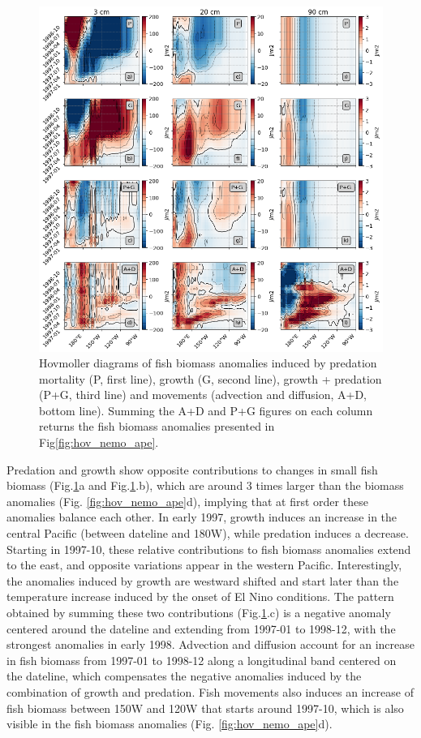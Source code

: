 \begin{figure}
	\centering
	\includegraphics[scale=0.4]{figs/hovmoller_anoms_oope_trends.png}	
	\caption{Hovmoller diagrams of fish biomass anomalies induced by predation mortality (P, first line), growth (G, second line), growth + predation (P+G, third line) and movements (advection and diffusion, A+D, bottom line). Summing the A+D and P+G figures on each column returns the fish biomass anomalies presented in Fig\ref{fig:hov_nemo_ape}.}	
	\label{fig:hov_ape_trends}
\end{figure}

Predation and growth show opposite contributions to changes in small fish biomass (Fig.\ref{fig:hov_ape_trends}a and Fig.\ref{fig:hov_ape_trends}.b), which are around 3 times larger than the biomass anomalies (Fig. \ref{fig:hov_nemo_ape}d), implying that at first order these anomalies balance each other. In early 1997, growth induces an increase in the central Pacific (between dateline and 180W), while predation induces a decrease. Starting in 1997-10, these relative contributions to fish biomass anomalies extend to the east, and opposite variations appear in the western Pacific. Interestingly, the anomalies induced by growth are westward shifted and start later than the temperature increase induced by the onset of El Nino conditions. The pattern obtained by summing these two contributions (Fig.\ref{fig:hov_ape_trends}.c) is a negative anomaly centered around the dateline and extending from 1997-01 to 1998-12, with the strongest anomalies in early 1998. Advection and diffusion account for an increase in fish biomass from 1997-01 to 1998-12 along a longitudinal band centered on the dateline, which compensates the negative anomalies induced by the combination of growth and predation. Fish movements also induces an increase of fish biomass between 150W and 120W that starts around 1997-10, which is also visible in the fish biomass anomalies (Fig. \ref{fig:hov_nemo_ape}d).

